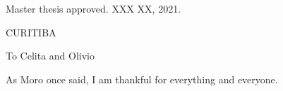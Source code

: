 \documentclass[12pt, %
               openright, %
               oneside, %
               a4paper, %
               chapter=TITLE, %
               section=TITLE, %
               brazil,
               english %
]{abntex2}
\begin{document}
%   
%   
\begin{folhadeaprovacao}
 \begin{center}
   {\ABNTEXchapterfont\large\imprimirautor}

   \vspace*{\fill}\vspace*{\fill}
   \begin{center}
     \ABNTEXchapterfont\bfseries\large\imprimirtitulo
   \end{center}
   \vspace*{\fill}

    \hspace{.45\textwidth}
    \begin{minipage}{.5\textwidth}
       \imprimirpreambulo
    \end{minipage}
   \vspace*{\fill}
 \end{center}

 Master thesis approved. XXX XX, 2021.


  \begin{center}
   \vspace*{0.5cm}
   {\large CURITIBA}
   \par
   {\large\imprimirdata}
   \vspace*{1cm}
 \end{center}

\end{folhadeaprovacao}
\begin{dedicatoria}
  \vspace*{22.7cm}
  \begin{flushright}
    \begin{minipage}[H]{4.5cm}
      {To Celita and Olivio}
    \end{minipage}
  \end{flushright}
\end{dedicatoria}
\begin{agradecimentos}
 As Moro once said, I am thankful for everything and everyone.
\end{agradecimentos}
\end{document}
